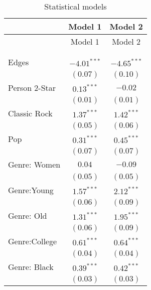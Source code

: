 
\usepackage{booktabs}
\usepackage{longtable}

\begin{center}
\begin{longtable}{l c c}
\toprule
 & Model 1 & Model 2 \\
\midrule
\endfirsthead
\toprule
 & Model 1 & Model 2 \\
\midrule
\endhead
\bottomrule
\endfoot
\bottomrule
\multicolumn{3}{l}{\scriptsize{$^{***}p<0.001$; $^{**}p<0.01$; $^{*}p<0.05$}}\\
\caption{Statistical models}
\label{table:coefficients}
\endlastfoot \\
Edges                             & $-4.01^{***}$ & $-4.65^{***}$ \\
                                  & $(0.07)$      & $(0.10)$      \\
Person 2-Star                     & $0.13^{***}$  & $-0.02$       \\
                                  & $(0.01)$      & $(0.01)$      \\
Classic Rock                      & $1.37^{***}$  & $1.42^{***}$  \\
                                  & $(0.05)$      & $(0.06)$      \\
Pop                               & $0.31^{***}$  & $0.45^{***}$  \\
                                  & $(0.07)$      & $(0.07)$      \\
Genre: Women                      & $0.04$        & $-0.09$       \\
                                  & $(0.05)$      & $(0.05)$      \\
Genre:Young                       & $1.57^{***}$  & $2.12^{***}$  \\
                                  & $(0.06)$      & $(0.09)$      \\
Genre: Old                        & $1.31^{***}$  & $1.95^{***}$  \\
                                  & $(0.06)$      & $(0.09)$      \\
Genre:College                     & $0.61^{***}$  & $0.64^{***}$  \\
                                  & $(0.04)$      & $(0.04)$      \\
Genre: Black                      & $0.39^{***}$  & $0.42^{***}$  \\
                                  & $(0.03)$      & $(0.03)$      \\

\end{longtable}
\end{center}
